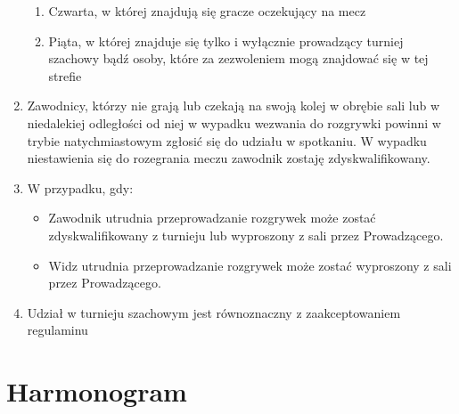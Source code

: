 \begin{enumerate}
\begin{enumerate}
\item Czwarta, w której znajdują się gracze oczekujący na mecz
\item Piąta, w której znajduje się tylko i wyłącznie prowadzący turniej szachowy bądź osoby, które za zezwoleniem mogą znajdować się w tej strefie
\end{enumerate}
\item Zawodnicy, którzy nie grają lub czekają na swoją kolej w obrębie sali lub w niedalekiej odległości od niej w wypadku wezwania do rozgrywki powinni w trybie natychmiastowym zgłosić się do udziału w spotkaniu. W wypadku niestawienia się do rozegrania meczu zawodnik zostaję zdyskwalifikowany.
\item W przypadku, gdy:
\begin{itemize}
\item Zawodnik utrudnia przeprowadzanie rozgrywek może zostać zdyskwalifikowany z turnieju lub wyproszony z sali przez Prowadzącego.
\item Widz utrudnia przeprowadzanie rozgrywek może zostać wyproszony z sali przez Prowadzącego.
\end{itemize}
\item Udział w turnieju szachowym jest równoznaczny z zaakceptowaniem regulaminu
\end{enumerate}


\section{Harmonogram}
